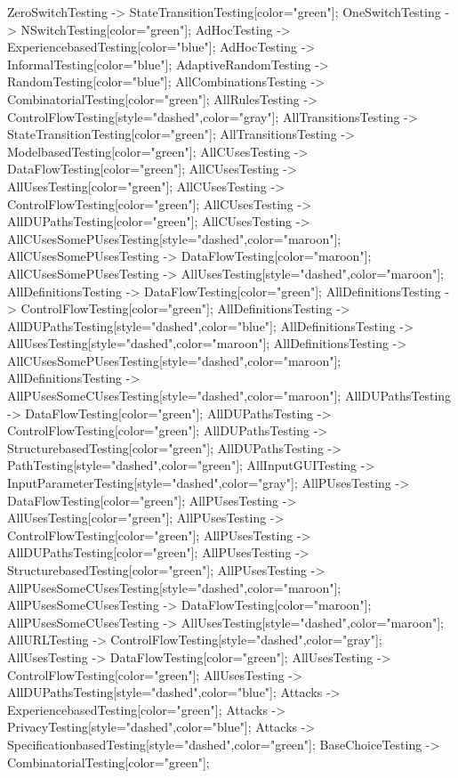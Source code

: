 \documentclass{article}
\begin{document}
{ZeroSwitchTesting -> StateTransitionTesting[color="green"];
OneSwitchTesting -> NSwitchTesting[color="green"];
AdHocTesting -> ExperiencebasedTesting[color="blue"];
AdHocTesting -> InformalTesting[color="blue"];
AdaptiveRandomTesting -> RandomTesting[color="blue"];
AllCombinationsTesting -> CombinatorialTesting[color="green"];
AllRulesTesting -> ControlFlowTesting[style="dashed",color="gray"];
AllTransitionsTesting -> StateTransitionTesting[color="green"];
AllTransitionsTesting -> ModelbasedTesting[color="green"];
AllCUsesTesting -> DataFlowTesting[color="green"];
AllCUsesTesting -> AllUsesTesting[color="green"];
AllCUsesTesting -> ControlFlowTesting[color="green"];
AllCUsesTesting -> AllDUPathsTesting[color="green"];
AllCUsesTesting -> AllCUsesSomePUsesTesting[style="dashed",color="maroon"];
AllCUsesSomePUsesTesting -> DataFlowTesting[color="maroon"];
AllCUsesSomePUsesTesting -> AllUsesTesting[style="dashed",color="maroon"];
AllDefinitionsTesting -> DataFlowTesting[color="green"];
AllDefinitionsTesting -> ControlFlowTesting[color="green"];
AllDefinitionsTesting -> AllDUPathsTesting[style="dashed",color="blue"];
AllDefinitionsTesting -> AllUsesTesting[style="dashed",color="maroon"];
AllDefinitionsTesting -> AllCUsesSomePUsesTesting[style="dashed",color="maroon"];
AllDefinitionsTesting -> AllPUsesSomeCUsesTesting[style="dashed",color="maroon"];
AllDUPathsTesting -> DataFlowTesting[color="green"];
AllDUPathsTesting -> ControlFlowTesting[color="green"];
AllDUPathsTesting -> StructurebasedTesting[color="green"];
AllDUPathsTesting -> PathTesting[style="dashed",color="green"];
AllInputGUITesting -> InputParameterTesting[style="dashed",color="gray"];
AllPUsesTesting -> DataFlowTesting[color="green"];
AllPUsesTesting -> AllUsesTesting[color="green"];
AllPUsesTesting -> ControlFlowTesting[color="green"];
AllPUsesTesting -> AllDUPathsTesting[color="green"];
AllPUsesTesting -> StructurebasedTesting[color="green"];
AllPUsesTesting -> AllPUsesSomeCUsesTesting[style="dashed",color="maroon"];
AllPUsesSomeCUsesTesting -> DataFlowTesting[color="maroon"];
AllPUsesSomeCUsesTesting -> AllUsesTesting[style="dashed",color="maroon"];
AllURLTesting -> ControlFlowTesting[style="dashed",color="gray"];
AllUsesTesting -> DataFlowTesting[color="green"];
AllUsesTesting -> ControlFlowTesting[color="green"];
AllUsesTesting -> AllDUPathsTesting[style="dashed",color="blue"];
Attacks -> ExperiencebasedTesting[color="green"];
Attacks -> PrivacyTesting[style="dashed",color="blue"];
Attacks -> SpecificationbasedTesting[style="dashed",color="green"];
BaseChoiceTesting -> CombinatorialTesting[color="green"];
}
\end{document}
